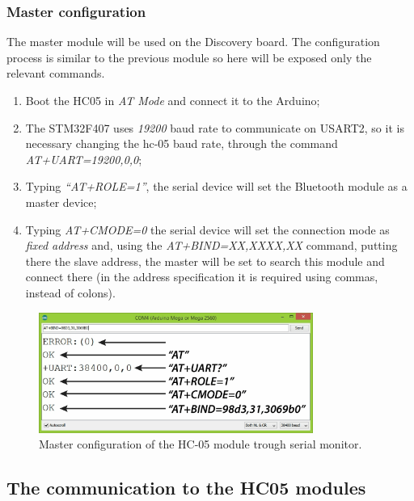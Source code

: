 \subsubsection{Master configuration}
The master module will be used on the Discovery board. The configuration process is similar to the previous module so here will be exposed only the relevant commands.\\
\begin{enumerate}
	\item Boot the HC05 in \textit{AT Mode} and connect it to the Arduino;
	\item The STM32F407 uses \textit{19200} baud rate to communicate on USART2, so it is necessary changing the hc-05 baud rate, through the command \textit{AT+UART=19200,0,0};
	\item Typing \textit{“AT+ROLE=1”}, the serial device will set the Bluetooth module as a master device;
	\item Typing \textit{AT+CMODE=0} the serial device will set the connection mode as \textit{fixed address} and, using the \textit{AT+BIND=XX,XXXX,XX} command, putting there the slave address, the master will be set to search this module and connect there (in the address specification it is required using commas, instead of colons).
\end{enumerate}

\begin{figure}[H]
	\hspace*{0.1 \textwidth}\includegraphics[width= 0.8\textwidth]
	{files/images/hc05_master}
	\caption{Master configuration of the HC-05 module trough serial monitor.}
\end{figure}
 \newpage
 
 \subsection{The communication to the HC05 modules}
 
